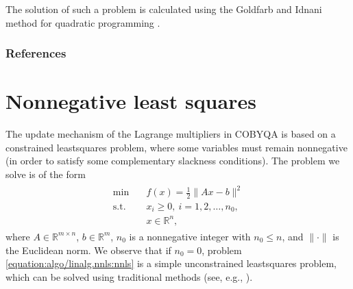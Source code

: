 \documentclass[letterpaper,10pt,english]{sphinxmanual}
\newcommand{\norm}[2][]{#1\lVert#2#1\rVert}
\def\R{\ensuremath{\mathds{R}}}
\begin{document}
\sphinxAtStartPar
The solution of such a problem is calculated using the Goldfarb and Idnani
method for quadratic programming .
\subsubsection*{References}


\section{Nonnegative least squares}
\label{\detokenize{algo/linalg.nnls:nonnegative-least-squares}}\label{\detokenize{algo/linalg.nnls:linalg-nnls}}\label{\detokenize{algo/linalg.nnls::doc}}
\sphinxAtStartPar
The update mechanism of the Lagrange multipliers in COBYQA is based on a
constrained least\sphinxhyphen{}squares problem, where some variables must remain nonnegative
(in order to satisfy some complementary slackness conditions). The problem we
solve is of the form
\begin{equation}\label{equation:algo/linalg.nnls:nnls}
\begin{split}\begin{array}{ll}
    \min        & \quad f(x) = \frac{1}{2} \norm{Ax - b}^2\\
    \text{s.t.} & \quad x_i \ge 0, ~ i = 1, 2, \dots, n_0,\\
                & \quad x \in \R^n,
\end{array}\end{split}
\end{equation}
\sphinxAtStartPar
where \(A \in \R^{m \times n}\), \(b \in \R^m\), \(n_0\) is a
nonnegative integer with \(n_0 \le n\), and \(\norm{\cdot}\) is the
Euclidean norm. We observe that if \(n_0 = 0\), problem \eqref{equation:algo/linalg.nnls:nnls} is a
simple unconstrained least\sphinxhyphen{}squares problem, which can be solved using
traditional methods (see, e.g., ).
\end{document}
